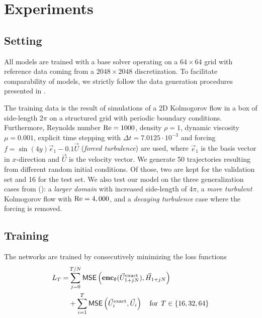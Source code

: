 \section{Experiments}

\subsection{Setting}
\label{subsec:setting}

All models are trained with a base solver operating on a $64\times64$ grid with reference data coming from a $2048\times2048$ discretization. To facilitate comparability  of models, we strictly follow the data generation procedures presented in \citeauthor{kochkov2021machine}. 

The training data is the result of simulations of a 2D Kolmogorov flow in a box of side-length $2\pi$ on a structured grid with periodic boundary conditions. Furthermore, Reynolds number $\operatorname{Re}=1000$, density $\rho=1$, dynamic viscosity $\mu=0.001$, explicit time stepping with $\Delta t = 7.0125 \cdot 10^{-3}$ and forcing $f = \sin (4y) \vec{e}_1 - 0.1 \vec{U}$ (\textit{forced turbulence}) are used, where $\vec{e}_1$ is the basis vector in $x$-direction and $\vec{U}$ is the velocity vector. We generate 50 trajectories resulting from different random initial conditions. Of those, two are kept for the validation set and 16 for the test set. We also test our model on the three generalization cases from \citeauthor{kochkov2021machine} (\citeyear{kochkov2021machine}): a \textit{larger domain} with increased side-length of $4\pi$, a \textit{more turbulent} Kolmogorov flow with $\operatorname{Re}=4,000$, and a \textit{decaying turbulence} case where the forcing is removed.
 
\subsection{Training}
\label{subsec:training}

The networks are trained by consecutively minimizing the loss functions 
{\footnotesize
\begin{align}
 L_T = &\sum_{j=0}^{T/N} \mathsf{MSE}\left( \textbf{enc}_{\theta}(\vec{U}_{1 + jN}^{\text{exact}}), \vec{H}_{1 + jN} \right) 
    \notag\\
    &+ 
    \sum_{i=1}^T \mathsf{MSE}\left(\vec{U}_i^{\text{exact}}, \vec{U}_i\right)
    \label{eq:lossfn} \quad \text{for} \;\, T\in \{16,32,64\}
\end{align}}

